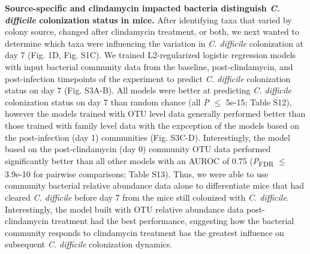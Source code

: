 \documentclass[11pt,]{article}
\begin{document}
\textbf{Source-specific and clindamycin impacted bacteria distinguish
\emph{C. difficile} colonization status in mice.} After identifying taxa
that varied by colony source, changed after clindamycin treatment, or
both, we next wanted to determine which taxa were influencing the
variation in \emph{C. difficile} colonization at day 7 (Fig. 1D, Fig.
S1C). We trained L2-regularized logistic regression models with input
bacterial community data from the baseline, post-clindamycin, and
post-infection timepoints of the experiment to predict \emph{C.
difficile} colonization status on day 7 (Fig. S3A-B). All models were
better at predicting \emph{C. difficile} colonization status on day 7
than random chance (all \emph{P} \(\le\) 5e-15; Table S12), however the
models trained with OTU level data generally performed better than those
trained with family level data with the expception of the models based
on the post-infection (day 1) communities (Fig. S3C-D). Interestingly,
the model based on the post-clindamycin (day 0) community OTU data
performed significantly better than all other models with an AUROC of
0.75 (\emph{P}\textsubscript{FDR} \(\le\) 3.9e-10 for pairwise
comparisons; Table S13). Thus, we were able to use community bacterial
relative abundance data alone to differentiate mice that had cleared
\emph{C. difficile} before day 7 from the mice still colonized with
\emph{C. difficile}. Interestingly, the model built with OTU relative
abundance data post-clindamycin treatment had the best performance,
suggesting how the bacterial community responds to clindamycin treatment
has the greatest influence on subsequent \emph{C. difficile}
colonization dynamics.
\end{document}

